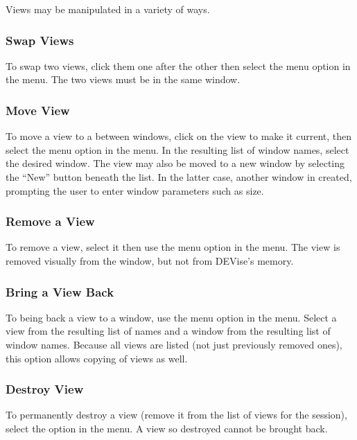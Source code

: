 Views may be manipulated in a variety of ways.

\subsubsection{Swap Views}

To swap two views, click them one after the other then select the  menu option in the  menu. The two views must be in the same
window.

\subsubsection{Move View}

To move a view to a between windows, click on the view to make it current, then
select the  menu option in the  menu. In the
resulting list of window names, select the desired window. The view may also be
moved to a new window by selecting the ``New'' button beneath the list. In the
latter case, another window in created, prompting the user to enter window
parameters such as size.

\subsubsection{Remove a View}

To remove a view, select it then use the  menu option in the
 menu. The view is removed visually from the window, but not from
DEVise's memory.

\subsubsection{Bring a View Back}

To being back a view to a window, use the  menu option in
the  menu. Select a view from the resulting list of names and a
window from the resulting list of window names. Because all views are listed
(not just previously removed ones), this option allows copying of views as well.

\subsubsection{Destroy View}

To permanently destroy a view (remove it from the list of views for the
session), select the  option in the  menu. A view
so destroyed cannot be brought back.


